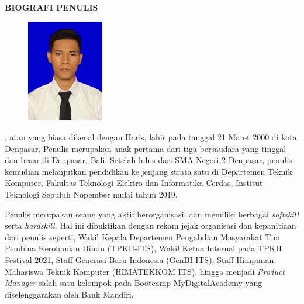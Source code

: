 \begin{center}
  \Large
  \textbf{BIOGRAFI PENULIS}
\end{center}


\vspace{2ex}

\begin{figure}
  \centering
  \vspace{-3ex}
  \includegraphics[width=0.3\textwidth]{gambar/HarisSetiadi.jpg}
  \vspace{-4ex}
\end{figure}

\name{}, atau yang biasa dikenal dengan Haris, lahir pada tanggal 21 Maret 2000 di kota Denpasar. Penulis merupakan anak pertama dari tiga bersaudara yang tinggal dan besar di Denpasar, Bali. Setelah lulus dari SMA Negeri 2 Denpasar, penulis kemudian melanjutkan pendidikan ke jenjang strata satu di Departemen Teknik Komputer, Fakultas Teknologi Elektro dan Informatika Cerdas, Institut Teknologi Sepuluh Nopember mulai tahun 2019. 

Penulis merupakan orang yang aktif berorganisasi, dan memiliki berbagai \emph{softskill} serta \emph{hardskill}. Hal ini dibuktikan dengan rekam jejak organisasi dan kepanitiaan dari penulis seperti, Wakil Kepala Departemen Pengabdian Masyarakat Tim Pembina Kerohanian Hindu (TPKH-ITS), Wakil Ketua Internal pada TPKH Festival 2021, Staff Generasi Baru Indonesia (GenBI ITS), Staff Himpunan Mahasiswa Teknik Komputer (HIMATEKKOM ITS), hingga menjadi \emph{Product Manager} salah satu kelompok pada Bootcamp MyDigitalAcademy yang diselenggarakan oleh Bank Mandiri.